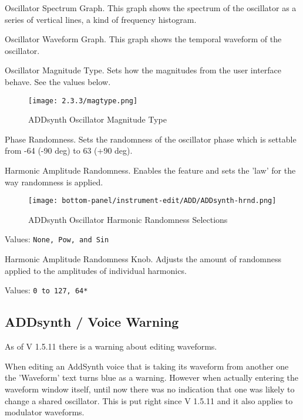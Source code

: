    Oscillator Spectrum Graph.
   This graph shows the spectrum of the oscillator as a series of vertical
   lines, a kind of frequency histogram.

   Oscillator Waveform Graph.
   This graph shows the temporal waveform  of the oscillator.

   Oscillator Magnitude Type.
   Sets how the magnitudes from the user interface behave.  See the values
   below.

   \begin{figure}[H]
   \centering
   \texttt{[image: 2.3.3/magtype.png]}
   \caption{ADDsynth Oscillator Magnitude Type}
   \label{fig:addsynth_magtype}
\end{figure}

   Phase Randomness. Sets the randomness of the oscillator phase which is
   settable from -64 (-90 deg) to 63 (+90 deg).

   Harmonic Amplitude Randomness.
   Enables the feature and sets the 'law' for the way randomness is applied.

\begin{figure}[H]
   \centering
   \texttt{[image: bottom-panel/instrument-edit/ADD/ADDsynth-hrnd.png]}
   \caption{ADDsynth Oscillator Harmonic Randomness Selections}
   \label{fig:addsynth_hrnd}
\end{figure}

   Values: \texttt{None, Pow, and Sin}

   Harmonic Amplitude Randomness Knob.
   Adjusts the amount of randomness applied to the amplitudes of individual harmonics.

   Values: \texttt{0 to 127, 64*}

\subsection{ADDsynth / Voice Warning}
\label{subsec:addsynth_voice-warning}
   As of V 1.5.11 there is a warning about editing waveforms.

   When editing an AddSynth voice that is taking its waveform from another one
   the 'Waveform' text turns blue as a warning. However when actually entering
   the waveform window itself, until now there was no indication that one was
   likely to change a shared oscillator. This is put right since V 1.5.11 and
   it also applies to modulator waveforms.

